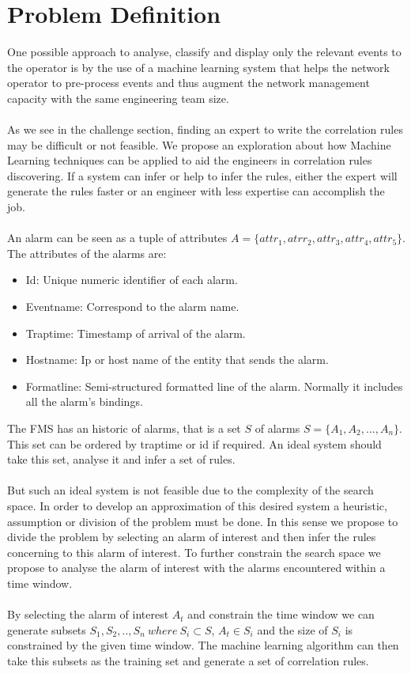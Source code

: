 \documentclass[10pt,a4paper]{article}
\begin{document}
 \section{Problem Definition}

 One possible approach to analyse, classify and display only the relevant events to the operator is by the use of a machine learning system that helps the network operator to pre-process events and thus augment the network management capacity with the same engineering team size.
 \\\\
As we see in the challenge section, finding an expert to write the correlation rules may be difficult or not feasible. We propose an exploration about how Machine Learning techniques can be applied to aid the engineers in correlation rules discovering. If a system can infer or help to infer the rules, either the expert will generate the rules faster or an engineer with less expertise can accomplish the job.
 \\\\
 An alarm can be seen as a tuple of attributes $A=\{attr_1, atrr_2, attr_3, attr_4, attr_5\}$. The attributes of the alarms are:

\begin{itemize}
  \item Id: Unique numeric identifier of each alarm.
  \item Eventname: Correspond to the alarm name.
  \item Traptime: Timestamp of arrival of the alarm.
  \item Hostname: Ip or host name of the entity that sends the alarm.
  \item Formatline: Semi-structured formatted line of the alarm. Normally it includes all the alarm's bindings.
\end{itemize}

 The FMS has an historic of alarms, that is a set $S$ of alarms $S=\{A_1, A_2, ...,A_n\}$. This set can be ordered by traptime or id if required. An ideal system should take this set, analyse it and infer a set of rules.
 \\\\
But such an ideal system is not feasible due to the complexity of the search space. In order to develop an approximation of this desired system a heuristic, assumption or division of the problem must be done. In this sense we propose to divide the problem by selecting an alarm of interest and then infer the rules concerning to this alarm of interest. To further constrain the search space we propose to analyse the alarm of interest with the alarms encountered within a time window.
 \\\\
By selecting the alarm of interest $A_t$ and constrain the time window we can generate subsets $S_1, S_2, .., S_n\ where\ S_i \subset S$, $A_t \in S_i$ and the size of $S_i$ is constrained by the given time window. The machine learning algorithm can then take this subsets  as the training set and generate a set of correlation rules.
\end{document}
